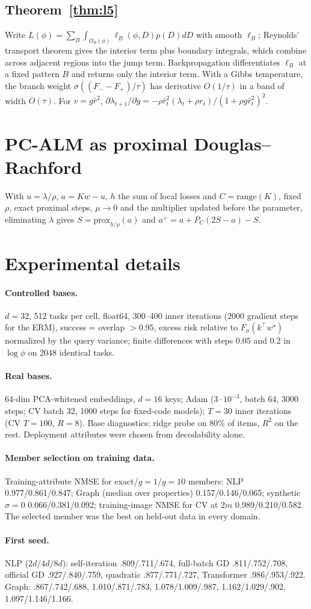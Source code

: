 \documentclass{article}
\theoremstyle{definition}
\theoremstyle{remark}
\newcommand{\Fsig}{F_{\sigma}}
\begin{document}
\subsection{Theorem~\ref{thm:l5}}
Write $L(\phi)=\sum_B\int_{\Omega_B(\phi)}\ell_B(\phi,D)p(D)dD$ with smooth $\ell_B$; Reynolds' transport theorem gives the interior term plus boundary integrals, which combine across adjacent regions into the jump term. Backpropagation differentiates $\ell_B$ at a fixed pattern $B$ and returns only the interior term. With a Gibbs temperature, the branch weight $\sigma((F_--F_+)/\tau)$ has derivative $O(1/\tau)$ in a band of width $O(\tau)$. For $v=g\hat r^2$, $\partial\lambda_{t+1}/\partial g=-\rho\hat r_t^2(\lambda_t+\rho r_t)/(1+\rho g\hat r_t^2)^2$.

\section{PC-ALM as proximal Douglas--Rachford}
\label{app:dr}
With $u=\lambda/\rho$, $a=Kw-u$, $h$ the sum of local losses and $C=\mathrm{range}(K)$, fixed $\rho$, exact proximal steps, $\mu\to0$ and the multiplier updated before the parameter, eliminating $\lambda$ gives $S=\mathrm{prox}_{h/\rho}(a)$ and $a^+=a+P_C(2S-a)-S$.

\section{Experimental details}
\label{app:details}
\paragraph{Controlled bases.} $d=32$, 512 tasks per cell, float64, 300--400 inner iterations (2000 gradient steps for the ERM), success = overlap $>0.95$, excess risk relative to $\Fsig(k^\top w^\star)$ normalized by the query variance; finite differences with steps $0.05$ and $0.2$ in $\log\phi$ on 2048 identical tasks.
\paragraph{Real bases.} 64-dim PCA-whitened embeddings, $d=16$ keys; Adam ($3\cdot10^{-3}$, batch 64, 3000 steps; CV batch 32, 1000 steps for fixed-code models); $T=30$ inner iterations (CV $T=100$, $R=8$). Base diagnostics: ridge probe on 80\% of items, $R^2$ on the rest. Deployment attributes were chosen from decodability alone.
\paragraph{Member selection on training data.} Training-attribute NMSE for exact/$g{=}1$/$g{=}10$ members: NLP 0.977/0.861/0.847; Graph (median over properties) 0.157/0.146/0.065; synthetic $\sigma=0$ 0.066/0.381/0.092; training-image NMSE for CV at $2m$ 0.989/0.210/0.582. The selected member was the best on held-out data in every domain.
\paragraph{First seed.} NLP ($2d/4d/8d$): self-iteration .809/.711/.674, full-batch GD .811/.752/.708, official GD .927/.840/.759, quadratic .877/.771/.727, Transformer .986/.953/.922. Graph: .867/.742/.688, 1.010/.871/.783, 1.078/1.009/.987, 1.162/1.029/.902, 1.097/1.146/1.166.
\end{document}
